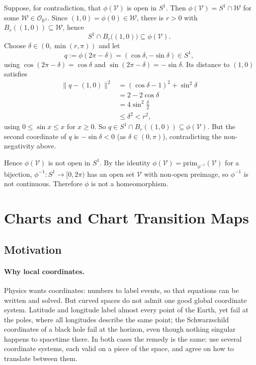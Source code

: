 \documentclass[11pt]{article}
\newcommand{\prim}[1]{\mathrm{prim}_{#1}}
\begin{document}
Suppose, for contradiction, that $\phi(\mathcal V)$ is open in $S^1$. Then $\phi(\mathcal V)=S^1\cap\mathcal W$ for some $\mathcal W\in\mathcal O_{\mathbb R^2}$. Since $(1,0)=\phi(0)\in\mathcal W$, there is $r>0$ with $B_r((1,0))\subseteq\mathcal W$, hence
\[
S^1\cap B_r\big((1,0)\big)\subseteq\phi(\mathcal V).
\]
Choose $\delta\in(0,\min(r,\pi))$ and let
\[
q:=\phi(2\pi-\delta)=(\cos\delta,-\sin\delta)\in S^1,
\]
using $\cos(2\pi-\delta)=\cos\delta$ and $\sin(2\pi-\delta)=-\sin\delta$. Its distance to $(1,0)$ satisfies
\begin{align*}
\lVert q-(1,0)\rVert^2
&=(\cos\delta-1)^2+\sin^2\delta\\
&=2-2\cos\delta\\
&=4\sin^2\tfrac\delta2\\
&\le\delta^2<r^2,
\end{align*}
using $0\le\sin x\le x$ for $x\ge0$. So $q\in S^1\cap B_r((1,0))\subseteq\phi(\mathcal V)$. But the second coordinate of $q$ is $-\sin\delta<0$ (as $\delta\in(0,\pi)$), contradicting the non-negativity above.

Hence $\phi(\mathcal V)$ is not open in $S^1$. By the identity $\phi(\mathcal V)=\prim{\phi^{-1}}(\mathcal V)$ for a bijection, $\phi^{-1}:S^1\to[0,2\pi)$ has an open set $\mathcal V$ with non-open preimage, so $\phi^{-1}$ is not continuous. Therefore $\phi$ is not a homeomorphism.

\section{Charts and Chart Transition Maps}

\subsection*{Motivation}

\paragraph{Why local coordinates.}
Physics wants coordinates: numbers to label events, so that equations can be written and solved. But curved spaces do not admit one good global coordinate system. Latitude and longitude label almost every point of the Earth, yet fail at the poles, where all longitudes describe the same point; the Schwarzschild coordinates of a black hole fail at the horizon, even though nothing singular happens to spacetime there. In both cases the remedy is the same: use several coordinate systems, each valid on a piece of the space, and agree on how to translate between them.
\end{document}
